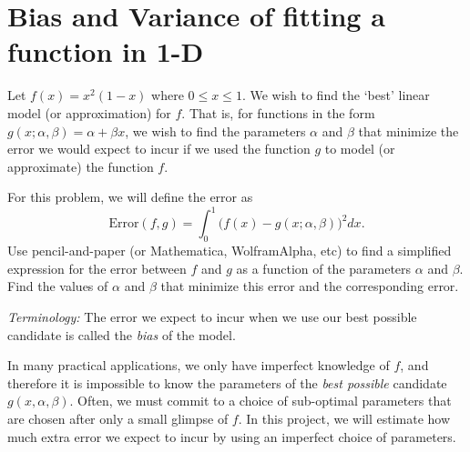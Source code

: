 \section{Bias and Variance of fitting a function in 1-D}

Let $f(x) = x^2(1-x)$ where $0 \leq x \leq 1$. We wish to find the `best' linear model (or approximation) for $f$. That is, for functions in the form $g(x; \alpha, \beta) =  \alpha +  \beta x$,  we wish to find the parameters $ \alpha$ and $ \beta$ that minimize the error we would expect to incur if we used the function $g$ to model (or approximate) the function $f$. 
\begin{center}
\end{center}
For this problem, we will define the error as
\begin{equation*}
\text{Error}(f,g) = \int_0^1 \bigg(f(x) - g(x; \alpha, \beta)\bigg)^2 dx.
\end{equation*} 
Use pencil-and-paper (or Mathematica, WolframAlpha, etc) to find a simplified expression for the error between $f$ and $g$ as a function of the parameters $ \alpha$ and $ \beta$. Find the values of $ \alpha$ and $ \beta$ that minimize this error and the corresponding error.

\noindent\textit{Terminology:} The error we expect to incur when we use our best possible candidate is called the \textit{bias} of the model.

In many practical applications, we only have imperfect knowledge of $f$, and therefore it is impossible to know the parameters of the \textit{best possible} candidate $g(x, \alpha, \beta)$. Often, we must commit to a choice of sub-optimal parameters that are chosen after only a small glimpse of $f$. In this project, we will estimate how much extra error we expect to incur by using an imperfect choice of parameters.


